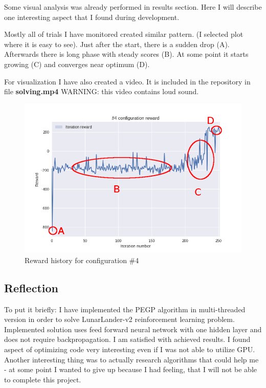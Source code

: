 \documentclass[12pt]{article}
\begin{document}
Some visual analysis was already performed in results section. Here I will describe one interesting aspect that I found during development.

Mostly all of trials I have monitored created similar pattern. (I selected plot where it is easy to see). Just after the start, there is a sudden drop (A). Afterwards there is long phase with steady scores (B). At some point it starts growing (C) and converges near optimum (D).

For visualization I have also created a video. It is included in the repository in file \textbf{solving.mp4} WARNING: this video contains loud sound.

\begin{figure}
\centering
\includegraphics[scale=0.9]{clues.png} 
\caption{Reward history for configuration \#4}
\end{figure}


\subsection{Reflection}

To put it briefly: I have implemented the PEGP algorithm in multi-threaded version in order to solve LunarLander-v2 reinforcement learning problem. Implemented solution uses feed forward neural network with one hidden layer and does not require backpropagation. I am satisfied with achieved results. I found aspect of optimizing code very interesting even if I was not able to utilize GPU. Another interesting thing was to actually research algorithms that could help me - at some point I wanted to give up because I had feeling, that I will not be able to complete this project.
\end{document}
